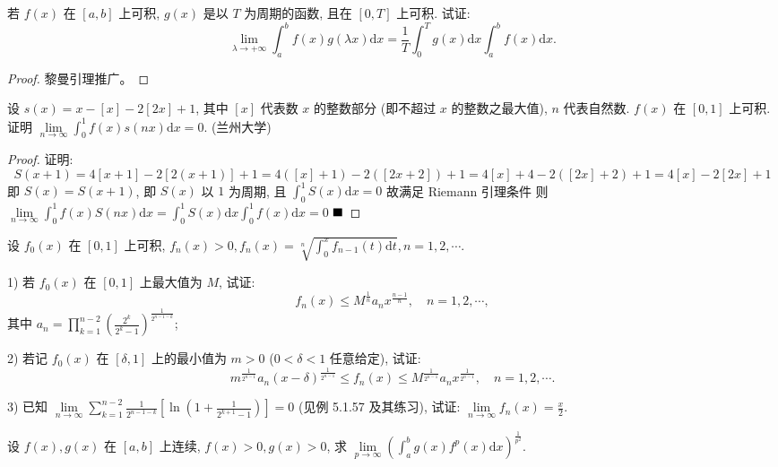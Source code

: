 \documentclass[lang=cn,newtx,10pt,scheme=chinese]{elegantbook}
\begin{document}
\begin{problem}
若 $f(x)$ 在 $[a,b]$ 上可积, $g(x)$ 是以 $T$ 为周期的函数, 且在 $[0,T]$ 上可积. 试证:
$$ \lim_{\lambda \to +\infty} \int_{a}^{b} f(x) g(\lambda x) \mathrm{d}x = \frac{1}{T} \int_{0}^{T} g(x) \mathrm{d}x \int_{a}^{b} f(x) \mathrm{d}x. $$
\end{problem}

\begin{proof}
    黎曼引理推广。
\end{proof}

\begin{problem}
设 $s(x) = x - [x] - 2[2x] + 1$, 其中 $[x]$ 代表数 $x$ 的整数部分 (即不超过 $x$ 的整数之最大值), $n$ 代表自然数. $f(x)$ 在 $[0,1]$ 上可积. 证明 $\lim\limits_{n \to \infty} \int_{0}^{1} f(x)s(nx) \mathrm{d}x = 0$. (兰州大学)
\end{problem}

\begin{proof}
证明:
$$S(x+1) = 4[x+1] - 2[2(x+1)] + 1
= 4([x]+1) - 2([2x+2]) + 1
= 4[x]+4 - 2([2x]+2) + 1
= 4[x] - 2[2x] + 1$$
即 $S(x) = S(x+1)$, 即 $S(x)$ 以 $1$ 为周期, 且 $\int_{0}^{1} S(x) \mathrm{d}x = 0$
故满足 Riemann 引理条件
则 $\lim\limits_{n \to \infty} \int_{0}^{1} f(x) S(nx) \mathrm{d}x = \int_{0}^{1} S(x) \mathrm{d}x \int_{0}^{1} f(x) \mathrm{d}x = 0$
$\hfill \blacksquare$
\end{proof}

\begin{problem}
设 $f_0(x)$ 在 $[0,1]$ 上可积, $f_n(x) > 0, f_n(x) = \sqrt[n]{\int_{0}^{x} f_{n-1}(t) \mathrm{d}t}, n=1,2,\cdots$.

1) 若 $f_0(x)$ 在 $[0,1]$ 上最大值为 $M$, 试证:
$$ f_n(x) \le M^{\frac{1}{n}} a_n x^{\frac{n-1}{n}}, \quad n=1,2,\cdots, $$
其中 $a_n = \prod_{k=1}^{n-2} \left( \frac{2^k}{2^k-1} \right)^{\frac{1}{2^{n-1-k}}}$;

2) 若记 $f_0(x)$ 在 $[\delta, 1]$ 上的最小值为 $m > 0$ ($0 < \delta < 1$ 任意给定), 试证:
$$ m^{\frac{1}{2^{n-1}}} a_n (x-\delta)^{\frac{1}{2^{n-1}}} \le f_n(x) \le M^{\frac{1}{2^{n-1}}} a_n x^{\frac{1}{2^{n-1}}}, \quad n=1,2,\cdots. $$

3) 已知 $\lim\limits_{n \to \infty} \sum_{k=1}^{n-2} \frac{1}{2^{n-1-k}} \left[ \ln\left(1+\frac{1}{2^{k+1}-1}\right) \right] = 0$ (见例 5.1.57 及其练习), 试证: $\lim\limits_{n \to \infty} f_n(x) = \frac{x}{2}$.
\end{problem}

\begin{problem}[$\bigstar$]
设 $f(x), g(x)$ 在 $[a,b]$ 上连续, $f(x) > 0, g(x) > 0$, 求 $\lim\limits_{p \to \infty} \left( \int_{a}^{b} g(x) f^p(x) \mathrm{d}x \right)^{\frac{1}{p^2}}$.
\end{problem}
\end{document}
